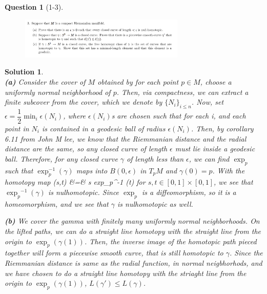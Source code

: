 \documentclass[11pt]{article}
\theoremstyle{plain}
\def\eQb#1\eQe{\begin{eqnarray*}#1\end{eqnarray*}}
\theoremstyle{quest}
\newtheorem*{question}{Question}
\newtheorem*{solution}{Solution}
\begin{document}
\begin{question}[1-3]
\hfill
\begin{figure}[h!]
  \centering
    \includegraphics[width=0.7\textwidth]{dg-s3-p3.png}
\end{figure}
\end{question}
\begin{solution} \hfill \\
\textbf{(a)}
Consider the cover of $M$ obtained by for each point $p \in M$, choose 
a uniformly normal neighborhood of $p$. Then, via compactness, we can 
extract a finite subcover from the cover, which we denote by $\{N_i\}_{i \leq n}$.
Now, set $\epsilon = \dfrac{1}{2}\min_{i} \epsilon(N_i)$, 
where $\epsilon(N_i)$s are chosen
such that for each i, and each point in $N_i$ 
is contained in a geodesic ball of radius
$\epsilon(N_i)$. Then, by corollary 6.11 from John M lee, we know that
the Riemmanian distance and the radial distance are the same, so any 
closed curve of length $\epsilon$ must lie inside a geodesic ball. Therefore,
for any closed curve $\gamma$ of length less than $\epsilon$, 
we can find $\exp_p$ such that 
$\exp_p^{-1}(\gamma)$ maps into $B(0,\epsilon)$ in $T_pM$ and $\gamma(0) = p$. 
With the homotopy map 
\eQb
H(s,t) &=& s exp_p^{-1} \gamma(t) 
\eQe 
for $s,t \in [0,1]\times[0,1]$, we see that ${\exp_p}^{-1}(\gamma)$ is nulhomotopic.
Since $\exp_p$ is a diffeomorphism, so it is a homeomorphism, and we see that
$\gamma$ is nulhomotopic as well. 

\bigskip

\noindent \textbf{(b)} We cover the gamma with finitely many uniformly normal 
neighborhoods. On the lifted paths, we can do a straight line homotopy 
with the straight line from the origin to $\exp_p(\gamma(1))$. Then, the inverse
image of the homotopic path pieced together will form a piecewise smooth curve,
that is still homotopic to $\gamma$. Since the Riemmanian distance is same as
the radial function, in normal neigbhorhods, and we have chosen to do a straight 
line homotopy with the striaght line from the origin to $\exp_p(\gamma(1))$,
$L(\gamma') \leq L(\gamma)$.

\bigskip


\end{solution}
\end{document}
